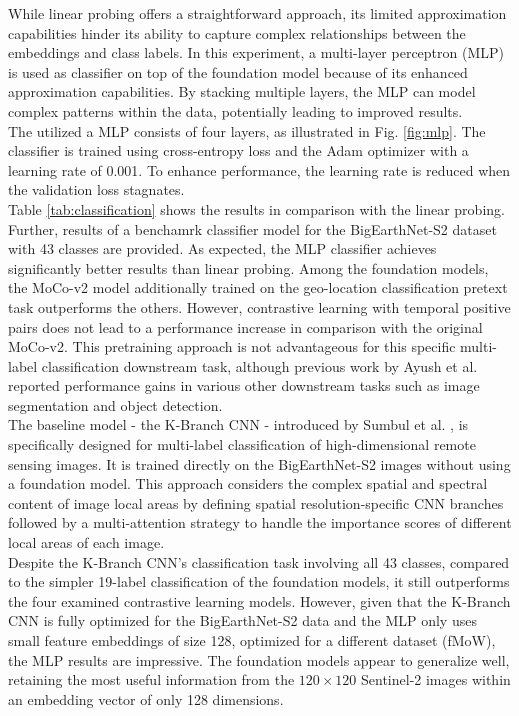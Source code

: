 While linear probing offers a straightforward approach, its limited approximation capabilities hinder its ability to capture complex relationships between the embeddings and class labels. In this experiment, a multi-layer perceptron (MLP) is used as classifier on top of the foundation model because of its enhanced approximation capabilities. By stacking multiple layers, the MLP can model complex patterns within the data, potentially leading to improved results. \\
The utilized a MLP consists of four layers, as illustrated in Fig. \ref{fig:mlp}. The classifier is trained using cross-entropy loss and the Adam optimizer with a learning rate of 0.001. To enhance performance, the learning rate is reduced when the validation loss stagnates. \\
Table \ref{tab:classification} shows the results in comparison with the linear probing. Further, results of a benchamrk classifier model for the BigEarthNet-S2 dataset with 43 classes are provided. As expected, the MLP classifier achieves significantly better results than linear probing. Among the foundation models, the MoCo-v2 model additionally trained on the geo-location classification pretext task outperforms the others. However, contrastive learning with temporal positive pairs does not lead to a performance increase in comparison with the original MoCo-v2. This pretraining approach is not advantageous for this specific multi-label classification downstream task, although previous work by Ayush et al. \cite{geoAwareSelfSuper} reported performance gains in various other downstream tasks such as image segmentation and object detection. \\
The baseline model - the K-Branch CNN - introduced by Sumbul et al. \cite{benchmark}, is specifically designed for multi-label classification of high-dimensional remote sensing images. It is trained directly on the BigEarthNet-S2 images without using a foundation model. This approach considers the complex spatial and spectral content of image local areas by defining spatial resolution-specific CNN branches followed by a multi-attention strategy to handle the importance scores of different local areas of each image. \\ 
Despite the K-Branch CNN's classification task involving all 43 classes, compared to the simpler 19-label classification of the foundation models, it still outperforms the four examined contrastive learning models.
However, given that the K-Branch CNN is fully optimized for the BigEarthNet-S2 data and the MLP only uses small feature embeddings of size 128, optimized for a different dataset (fMoW), the MLP results are impressive. The foundation models appear to generalize well, retaining the most useful information from the $120\times120$ Sentinel-2 images within an embedding vector of only 128 dimensions.  \\

